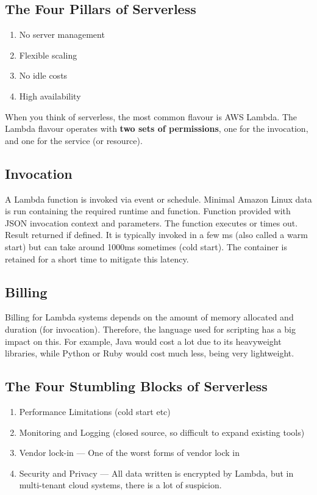 \documentclass[11pt,a4paper,titlepage,dvipsnames,cmyk]{scrartcl}
\begin{document}
\subsection{The Four Pillars of Serverless}
\begin{enumerate}
\item No server management
\item Flexible scaling
\item No idle costs
\item High availability
\end{enumerate}

When you think of serverless, the most common flavour is AWS Lambda. The Lambda flavour operates with \textbf{two sets of permissions}, one for the invocation, and one for the service (or resource).

\subsection{Invocation}
A Lambda function is invoked via event or schedule. Minimal Amazon Linux data is run containing the required runtime and function. Function provided with JSON invocation context and parameters. The function executes or times out. Result returned if defined. It is typically invoked in a few ms (also called a warm start) but can take around 1000ms sometimes (cold start). The container is retained for a short time to mitigate this latency.

\subsection{Billing}
Billing for Lambda systems depends on the amount of memory allocated and duration (for invocation). Therefore, the language used for scripting has a big impact on this. For example, Java would cost a lot due to its heavyweight libraries, while Python or Ruby would cost much less, being very lightweight.

\subsection{The Four Stumbling Blocks of Serverless}
\begin{enumerate}
\item Performance Limitations (cold start etc)
\item Monitoring and Logging (closed source, so difficult to expand existing tools)
\item Vendor lock-in --- One of the worst forms of vendor lock in
\item Security and Privacy --- All data written is encrypted by Lambda, but in multi-tenant cloud systems, there is a lot of suspicion.
\end{enumerate}
\end{document}
